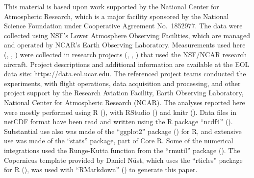 \documentclass[amt, manuscript]{copernicus}
\begin{document}


\begin{acknowledgements}
This material is based upon work supported by the National Center for
Atmospheric Research, which is a major facility sponsored by the
National Science Foundation under Cooperative Agreement No.~1852977. The
data were collected using NSF's Lower Atmosphere Observing Facilities,
which are managed and operated by NCAR's Earth Observing Laboratory.
Measurements used here (\citet{VOCALS2011}, \citet{SOCRATES2019},
\citet{WECAN2018}) were collected in research projects
(\citet{wood2011vamos}, \citet{albrecht2019CSET},
\citet{mcfarquhar2021observations}) that used the NSF/NCAR research
aircraft. Project descriptions and additional information are available
at the EOL data site:
\href{https://data.eol.ucar.edu}{https://data.eol.ucar.edu}. The
referenced project teams conducted the experiments, with flight
operations, data acquisition and processing, and other project support
by the Research Aviation Facility, Earth Observing Laboratory, National
Center for Atmospheric Research (NCAR). The analyses reported here were
mostly performed using R (\citet{Rlanguage}), with RStudio
(\citet{RStudio2021}) and knitr (\citet{Xie2015,Xie2021}). Data files in
netCDF format have been read and written using the R package ``ncdf4''
(\citet{ncdf4}). Substantial use also was made of the ``ggplot2''
package (\citet{wickham2009}) for R, and extensive use was made of the
``stats'' package, part of Core R. Some of the numerical integrations
used the Runge-Kutta function from the ``rmutil'' package
(\citet{runge.kutta}). The Copernicus template provided by Daniel Nüst,
which uses the ``rticles'' package for R (\citet{rticles}), was used
with ``RMarkdown'' (\citet{XieEtAl2018RMarkdown}) to generate this
paper.
\end{acknowledgements}


\end{document}
